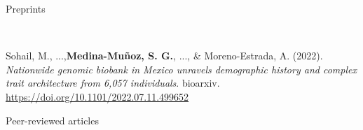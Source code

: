 

\large{Preprints}

\begin{cventries}
\cventry
{$\;$}
{$\;$}
{$\;$}
{$\;$}
{
  \begin{cvitems} %
      \item {
          \begin{flushleft}
            Sohail, M., ...,\textbf{Medina-Muñoz, S. G.}, ..., \& Moreno-Estrada, A. (2022).
            \textit{Nationwide genomic biobank in Mexico unravels demographic history and complex trait architecture from 6,057 individuals}. bioarxiv.\\
            \url{https://doi.org/10.1101/2022.07.11.499652}
          \end{flushleft}
        }
  \end{cvitems}
}


\end{cventries}


\large{Peer-reviewed articles}

